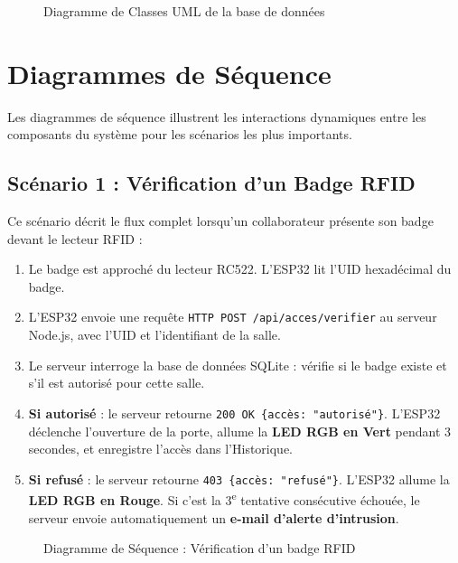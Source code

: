 \documentclass[12pt,a4paper]{report}
\begin{document}
\begin{figure}[h]
    \centering
    \caption{Diagramme de Classes UML de la base de données}
\end{figure}

\section{Diagrammes de Séquence}

Les diagrammes de séquence illustrent les interactions dynamiques entre les composants du système pour les scénarios les plus importants.

\subsection{Scénario 1 : Vérification d'un Badge RFID}
Ce scénario décrit le flux complet lorsqu'un collaborateur présente son badge devant le lecteur RFID :

\begin{enumerate}
    \item Le badge est approché du lecteur RC522. L'ESP32 lit l'UID hexadécimal du badge.
    \item L'ESP32 envoie une requête \texttt{HTTP POST /api/acces/verifier} au serveur Node.js, avec l'UID et l'identifiant de la salle.
    \item Le serveur interroge la base de données SQLite : vérifie si le badge existe et s'il est autorisé pour cette salle.
    \item \textbf{Si autorisé} : le serveur retourne \texttt{200 OK \{accès: "autorisé"\}}. L'ESP32 déclenche l'ouverture de la porte, allume la \textbf{LED RGB en Vert} pendant 3 secondes, et enregistre l'accès dans l'Historique.
    \item \textbf{Si refusé} : le serveur retourne \texttt{403 \{accès: "refusé"\}}. L'ESP32 allume la \textbf{LED RGB en Rouge}. Si c'est la 3\textsuperscript{e} tentative consécutive échouée, le serveur envoie automatiquement un \textbf{e-mail d'alerte d'intrusion}.
\end{enumerate}

\begin{figure}[h]
    \centering
    \caption{Diagramme de Séquence : Vérification d'un badge RFID}
\end{figure}
\end{document}
